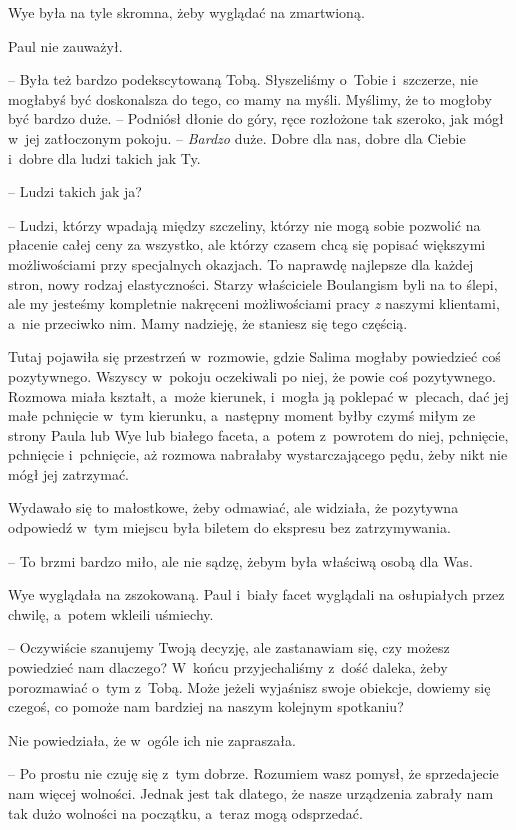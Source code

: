 \documentclass[oneside,polish,11pt,sfheadings]{mwbk}
\begin{document}
Wye była na tyle skromna, żeby wyglądać na zmartwioną.

Paul nie zauważył. 

-- Była też bardzo podekscytowaną Tobą. Słyszeliśmy o~Tobie i~szczerze, nie mogłabyś być doskonalsza do tego, co mamy na
myśli. Myślimy, że to mogłoby być bardzo duże. -- Podniósł dłonie do
góry, ręce rozłożone tak szeroko, jak mógł w~jej zatłoczonym pokoju. -- \textit{Bardzo} duże. Dobre dla nas, dobre dla Ciebie i~dobre dla ludzi
takich jak Ty.

-- Ludzi takich jak ja?

-- Ludzi, którzy wpadają między szczeliny, którzy nie mogą sobie pozwolić
na płacenie całej ceny za wszystko, ale którzy czasem chcą się popisać
większymi możliwościami przy specjalnych okazjach. To naprawdę najlepsze
dla każdej stron, nowy rodzaj elastyczności. Starzy właściciele
Boulangism byli na to ślepi, ale my jesteśmy kompletnie nakręceni
możliwościami pracy \textit{z }naszymi klientami, a~nie przeciwko nim.
Mamy nadzieję, że staniesz się tego częścią.

Tutaj pojawiła się przestrzeń w~rozmowie, gdzie Salima mogłaby
powiedzieć coś pozytywnego. Wszyscy w~pokoju oczekiwali po niej, że
powie coś pozytywnego. Rozmowa miała kształt, a~może kierunek, i~mogła
ją poklepać w~plecach, dać jej małe pchnięcie w~tym kierunku, a~następny
moment byłby czymś miłym ze strony Paula lub Wye lub białego faceta, a~potem z~powrotem do niej, pchnięcie, pchnięcie i~pchnięcie, aż rozmowa
nabrałaby wystarczającego pędu, żeby nikt nie mógł jej zatrzymać.

Wydawało się to małostkowe, żeby odmawiać, ale widziała, że pozytywna
odpowiedź w~tym miejscu była biletem do ekspresu bez zatrzymywania.

-- To brzmi bardzo miło, ale nie sądzę, żebym była właściwą osobą dla
Was.

Wye wyglądała na zszokowaną. Paul i~biały facet wyglądali na osłupiałych
przez chwilę, a~potem wkleili uśmiechy. 

-- Oczywiście szanujemy Twoją
decyzję, ale zastanawiam się, czy możesz powiedzieć nam dlaczego? W~końcu przyjechaliśmy z~dość daleka, żeby porozmawiać o~tym z~Tobą. Może
jeżeli wyjaśnisz swoje obiekcje, dowiemy się czegoś, co pomoże nam
bardziej na naszym kolejnym spotkaniu?

Nie powiedziała, że w~ogóle ich nie zapraszała. 

-- Po prostu nie czuję
się z~tym dobrze. Rozumiem wasz pomysł, że sprzedajecie nam więcej
wolności. Jednak jest tak dlatego, że nasze urządzenia zabrały nam tak
dużo wolności na początku, a~teraz mogą odsprzedać.
\end{document}
